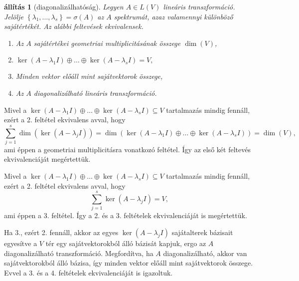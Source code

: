 \documentclass[a4paper, showtrims]{memoir}
\makeatletter
\renewenvironment{proof}[1][\proofname]
    {\par\pushQED{\qed}%
    \normalfont \topsep6\p@\@plus6\p@\relax
    \trivlist
    \item[\hskip\labelsep
        \itshape
    #1\@addpunct{:}]\ignorespaces}
    {\popQED\endtrivlist\@endpefalse}
\theoremstyle{plain}
\newtheorem{proposition}{állítás}[chapter]
\theoremstyle{remark}
\theoremstyle{definition}
\makeatother
\begin{document}
\begin{proposition}[diagonalizálhatóság]\label{pr:diagkar}
	Legyen $A\in L\left( V \right)$ lineáris transzformáció.
	Jelölje $\left\{ \lambda_1,\ldots,\lambda_s \right\}=\sigma\left( A \right)$
	az $A$ spektrumát,
	azaz valamennyi különböző sajátértékét.
	Az alábbi feltevések ekvivalensek.
	\begin{enumerate}
		\item Az $A$ sajátértékei geometriai multiplicitásának összege $\dim(V)$,
		\item
		      \begin{math}
			      \ker\left( A-\lambda_1 I \right)\oplus\dots\oplus\ker\left( A-\lambda_s I \right)=V,
		      \end{math}
		\item Minden vektor előáll mint sajátvektorok összege,
		\item Az $A$ diagonalizálható lineáris transzformáció.\qedhere
	\end{enumerate}
\end{proposition}
\begin{proof}
	Mivel a $\ker\left( A-\lambda_1 I \right)\oplus\dots\oplus\ker\left( A-\lambda_s I \right)\subseteq V$
	tartalmazás mindig fennáll,
	ezért a 2. feltétel ekvivalens avval, hogy
	\[
		\sum_{j=1}^s\dim\left( \ker\left( A-\lambda_j I \right) \right)
		=
		\dim\left(
		\ker\left( A-\lambda_1 I \right)\oplus\dots\oplus\ker\left( A-\lambda_s I \right)
		\right)
		=\dim(V),
	\]
	ami éppen a geometriai multiplicitásra vonatkozó feltétel.
	Így az első két feltevés ekvivalenciáját megértettük.


	Mivel a $\ker\left( A-\lambda_1 I \right)\oplus\dots\oplus\ker\left( A-\lambda_s I \right)\subseteq V$
	tartalmazás mindig fennáll,
	ezért a 2. feltétel ekvivalens avval, hogy
	\[
		\sum_{j=1}^s\ker\left( A-\lambda_j I \right)=V,
	\]
	ami éppen a 3. feltétel.
	Így a 2. és a 3. feltételek ekvivalenciáját is megértettük.

	Ha 3., ezért 2. fennáll, akkor az egyes $\ker\left( A-\lambda_j I \right)$ sajátalterek bázisait egyesítve a
	$V$ tér egy sajátvektorokból álló bázisát kapjuk,
	ergo az $A$ diagonalizálható transzformáció.
	Megfordítva,
	ha $A$ diagonalizálható,
	akkor van sajátvektorokból álló bázisa,
	így minden vektor előáll mint sajátvektorok összege.
	Evvel a 3. és a 4. feltételek ekvivalenciáját is igazoltuk.
\end{proof}
\end{document}
